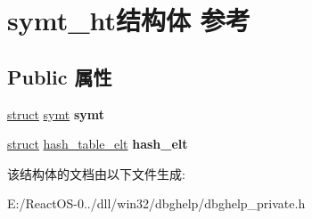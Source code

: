 \hypertarget{structsymt__ht}{}\section{symt\+\_\+ht结构体 参考}
\label{structsymt__ht}
\subsection*{Public 属性}
\begin{DoxyCompactItemize}
\item 
\mbox{\label{structsymt__ht_ac6943e8d1dfde6fb9d49df97054ce3e6}} 
\hyperlink{interfacestruct}{struct} \hyperlink{structsymt}{symt} {\bfseries symt}
\item 
\mbox{\label{structsymt__ht_a350445965e2e053c48cf3a32acbaf372}} 
\hyperlink{interfacestruct}{struct} \hyperlink{structhash__table__elt}{hash\+\_\+table\+\_\+elt} {\bfseries hash\+\_\+elt}
\end{DoxyCompactItemize}


该结构体的文档由以下文件生成\+:\begin{DoxyCompactItemize}
\item 
E\+:/\+React\+O\+S-\/0../dll/win32/dbghelp/dbghelp\+\_\+private.\+h\end{DoxyCompactItemize}
